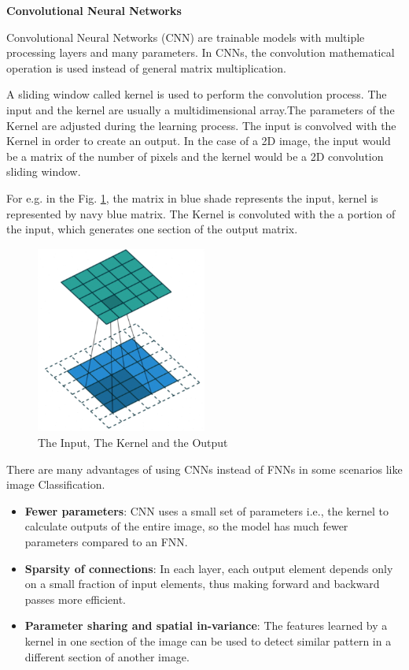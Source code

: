 \noindent \textbf{Convolutional Neural Networks}
\newline

\noindent Convolutional Neural Networks (CNN) are trainable models with multiple processing layers and many parameters. In CNNs, the convolution mathematical operation is used instead of general matrix multiplication. 

A sliding window called kernel is used to perform the convolution process. The input and the kernel are usually a multidimensional array.The parameters of the Kernel are adjusted during the learning process. The input is convolved with the Kernel in order to create an output. In the case of a 2D image, the input would be a matrix of the number of pixels and the kernel would be a 2D convolution sliding window.

For e.g. in the Fig. \ref{fig:CNN}, the matrix in blue shade represents the input, kernel is represented by navy blue matrix. The Kernel is convoluted with the a portion of the input, which generates one section of the output matrix. 

\begin{figure}[ht]
  \begin{center}
    \includegraphics[width=0.50\textwidth]{Master's thesis/images/cnn.PNG} 
    \caption{The Input, The Kernel and the Output ~\cite{shafkat_2018}}
    \label{fig:CNN}
  \end{center}
\end{figure} 

There are many advantages of using CNNs instead of FNNs in some scenarios like image Classification.
\begin{itemize}
    \item \textbf{Fewer parameters}: CNN uses a small set of parameters i.e., the kernel to calculate outputs of the entire image, so the model has much fewer parameters compared to an FNN.
    \item \textbf{Sparsity of connections}: In each layer, each output element depends only on a small fraction of input elements, thus making forward and backward passes more efficient.
    \item \textbf{Parameter sharing and spatial in-variance}: The features learned by a kernel in one section of the image can be used to detect similar pattern in a different section of another image.
\end{itemize}



